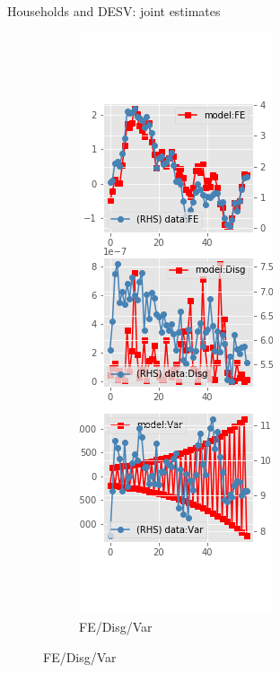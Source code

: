 \documentclass{beamer}
\begin{document}
\begin{frame}{Households and DESV: joint estimates}
\begin{figure}[ht]
\begin{subfigure}[b]{0.2\textwidth}
		\end{subfigure}
		\hfill
		\begin{subfigure}[b]{0.2\textwidth}
			\caption{FE/Disg/Var}
			\includegraphics[width=\textwidth, height = 0.8\textheight]{figuresDraft/sce_de_est_sv_joint_diag2.png}
		\end{subfigure}
	\end{figure}
\end{frame}
\end{document}
